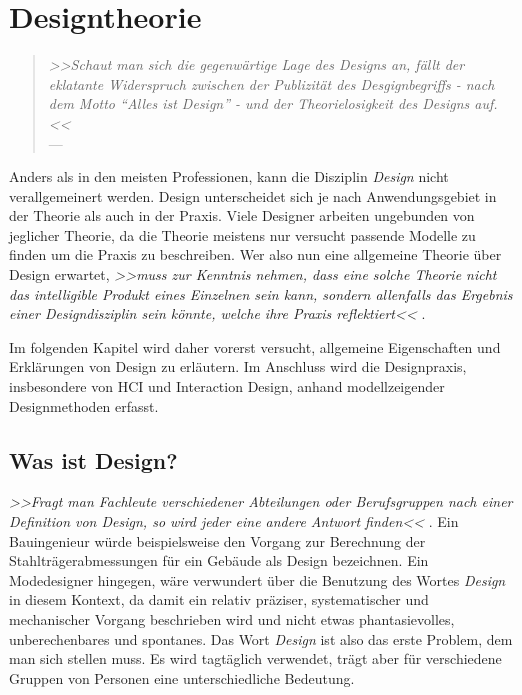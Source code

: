 \chapter{Designtheorie}\label{ch:designTheorie} 

\begin{quote}
	\begin{flushright}{\slshape    
	    >>Schaut man sich die gegenwärtige Lage des Designs an, fällt der eklatante Widerspruch zwischen der Publizität des Desgignbegriffs - nach dem Motto ``Alles ist Design'' - und der Theorielosigkeit des Designs auf.<<} \\ \medskip
	    ---  \citep{Bonsiepe:1992}
	\end{flushright}
\end{quote}

Anders als in den meisten Professionen, kann die Disziplin \emph{Design} nicht verallgemeinert werden. Design unterscheidet sich je nach Anwendungsgebiet in der Theorie als auch in der Praxis. Viele Designer arbeiten ungebunden von jeglicher Theorie, da die Theorie meistens nur versucht passende Modelle zu finden um die Praxis zu beschreiben. Wer also nun eine allgemeine Theorie über Design erwartet, \emph{>>muss zur Kenntnis nehmen, dass eine solche Theorie nicht das intelligible Produkt eines Einzelnen sein kann, sondern allenfalls das Ergebnis einer Designdisziplin sein könnte, welche ihre Praxis reflektiert<<} \citep{Schneider:2008}.

\medskip Im folgenden Kapitel wird daher vorerst versucht, allgemeine Eigenschaften und Erklärungen von Design zu erläutern. Im Anschluss wird die Designpraxis, insbesondere von \ac{HCI} und Interaction Design, anhand modellzeigender Designmethoden erfasst.

\section{Was ist Design?} 
\emph{>>Fragt man Fachleute verschiedener Abteilungen oder Berufsgruppen nach einer Definition von Design, so wird jeder eine andere Antwort finden<<} \citep{Sagmeister:2008}. Ein Bauingenieur würde beispielsweise den Vorgang zur Berechnung der Stahlträgerabmessungen für ein Gebäude als Design bezeichnen. Ein Modedesigner hingegen, wäre verwundert über die Benutzung des Wortes \emph{Design} in diesem Kontext, da damit ein relativ präziser, systematischer und mechanischer Vorgang beschrieben wird und nicht etwas phantasievolles, unberechenbares und spontanes. Das Wort \emph{Design} ist also das erste Problem, dem man sich stellen muss. Es wird tagtäglich verwendet, trägt aber für verschiedene Gruppen von Personen eine unterschiedliche Bedeutung. \citep{Lawson:1997}


